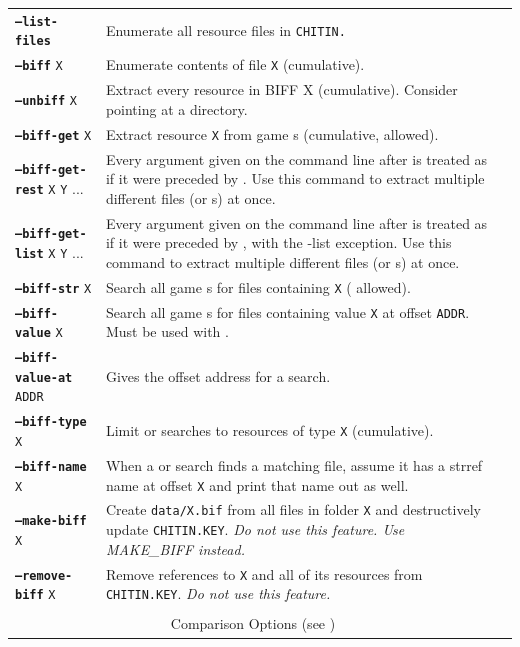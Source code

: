 \documentclass{article}
\def\ttref#1{\ahrefloc{#1}{\tt #1}}
\def\DEFINE#1{{\tt \bf #1}\label{#1}\index{#1}}
\def\t#1{{\tt #1}}
\begin{document}
\begin{tabular}{lp{10in}|p{10in}}
\DEFINE{--list-files}&	Enumerate all resource files in \t{CHITIN.}\ttref{KEY} \\
\DEFINE{--biff} \t{X} & Enumerate contents of \ttref{BIFF} file \t{X} (cumulative). \\
\DEFINE{--unbiff} \t{X} & Extract every resource in BIFF X
(cumulative). Consider pointing \ttref{--out} at a directory. \\
\DEFINE{--biff-get} \t{X}&	Extract resource \t{X} from game \ttref{BIFF}s (cumulative, \ttref{regexp} allowed). \\
\DEFINE{--biff-get-rest} \t{X} \t{Y} ... & Every argument given on the
command line after \ttref{--biff-get-rest} is treated as if it were
preceded by \ttref{--biff-get}. Use this command to extract multiple
different files (or \ttref{regexp}s) at once. \\
\DEFINE{--biff-get-list} \t{X} \t{Y} ... & Every argument given on the
command line after \ttref{--biff-get-rest} is treated as if it were
preceded by \ttref{--biff-get}, with the -list exception. Use this command to extract multiple
different files (or \ttref{regexp}s) at once. \\
\DEFINE{--biff-str} \t{X}&	Search all game \ttref{BIFF}s for files
containing \t{X} (\ttref{regexp} allowed). \\
\DEFINE{--biff-value} \t{X} &   Search all game \ttref{BIFF}s for files
containing value \t{X} at offset \t{ADDR}. Must be used with
\ttref{--biff-value-at}. \\
\DEFINE{--biff-value-at} \t{ADDR} & Gives the offset address for a
\ttref{--biff-value} search. \\
\DEFINE{--biff-type} \t{X}&	Limit \ttref{--biff-str} or
\ttref{--biff-value} searches to
resources of type \t{X} (cumulative). \\
\DEFINE{--biff-name} \t{X}&	When a \ttref{--biff-str} or
\ttref{--biff-value} search finds a
matching file, assume it has a strref name at offset \t{X} and print that
name out as well. \\
\DEFINE{--make-biff} \t{X} & Create \t{data/X.bif} from all files in
folder \t{X} and destructively update \t{CHITIN.KEY}. \emph{Do not use this
feature. Use MAKE_BIFF instead.} \\
\DEFINE{--remove-biff} \t{X} & Remove references to \ttref{BIFF} \t{X} and
all of its resources from \t{CHITIN.KEY}. \emph{Do not use this feature.} \\
\\
\multicolumn{2}{c}{ {\color{red} Comparison Options} (see \ttref{--out})} \\

\end{tabular}
\end{document}

